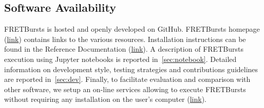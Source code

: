 \subsection{Software Availability}
FRETBursts is hosted and openly developed on GitHub. FRETBursts homepage 
(\href{http://tritemio.github.io/FRETBursts}{link})
contains links to the various resources. Installation instructions can be found in the
Reference Documentation (\href{http://fretbursts.readthedocs.org/en/latest/getting_started.html}{link}). 
A description of FRETBursts execution using Jupyter notebooks is reported 
in~\ref{sec:notebook}.
Detailed information on development style, testing strategies and 
contributions guidelines are reported in~\ref{sec:dev}.
Finally, to facilitate evaluation and comparison with other software, 
we setup an on-line services allowing to execute FRETBursts 
without requiring any installation on the user's computer (\href{https://github.com/tritemio/FRETBursts_notebooks#run-online}{link}).
